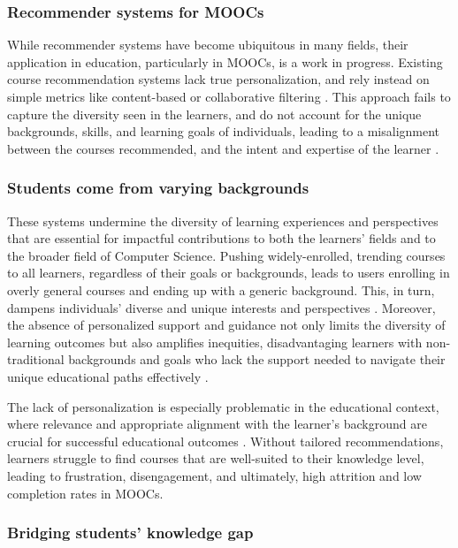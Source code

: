 \subsubsection{Recommender systems for MOOCs} 

While recommender systems have become ubiquitous in many fields, their application in education, particularly in MOOCs, is a work in progress. Existing course recommendation systems lack true personalization, and rely instead on simple metrics like content-based or collaborative filtering \cite{deschenes_recommender_2020} \cite{da_silva_systematic_2023} \cite{khalid_recommender_2020}. This approach fails to capture the diversity seen in the learners, and do not account for the unique backgrounds, skills, and learning goals of individuals, leading to a misalignment between the courses recommended, and the intent and expertise of the learner \cite{noauthor_reinforced_nodate}.

\subsubsection{Students come from varying backgrounds}

These systems undermine the diversity of learning experiences and perspectives that are essential for impactful contributions to both the learners' fields and to the broader field of Computer Science. Pushing widely-enrolled, trending courses to all learners, regardless of their goals or backgrounds, leads to users enrolling in overly general courses and ending up with a generic background. This, in turn, dampens individuals’ diverse and unique interests and perspectives \cite{noauthor_2022_nodate}. Moreover, the absence of personalized support and guidance not only limits the diversity of learning outcomes but also amplifies inequities, disadvantaging learners with non-traditional backgrounds and goals who lack the support needed to navigate their unique educational paths effectively \cite{dumont_promise_2023}.

The lack of personalization is especially problematic in the educational context, where relevance and appropriate alignment with the learner's background are crucial for successful educational outcomes \cite{noauthor_building_2017}. Without tailored recommendations, learners struggle to find courses that are well-suited to their knowledge level, leading to frustration, disengagement, and ultimately, high attrition and low completion rates in MOOCs.

\subsubsection{Bridging students' knowledge gap}

